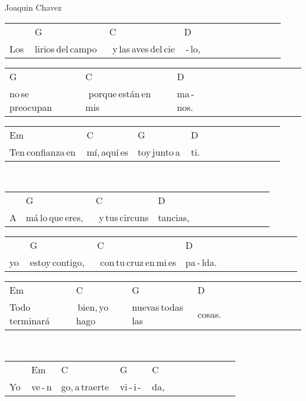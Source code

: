 Joaquin Chavez\hfill
\begin{multicols}{2}
\noindent
\begin{minipage}{\columnwidth}
\noindent
\noindent
\begin{tabular}{llllllllllll}
&G&C&D\\
Los\,&lirios\,del\,campo\,\,&\,\,y\,las\,aves\,del\,cie&\,-\,lo,
\end{tabular}

\noindent
\begin{tabular}{llllllllllll}
G&C&D\\
no\,se\,preocupan\,\,&\,\,porque\,están\,en\,mis\,&ma\,-\,nos.
\end{tabular}

\noindent
\begin{tabular}{llllllllllll}
Em&C&G&D\\
Ten\,confianza\,en\,&mí,\,aquí\,es&toy\,junto\,a\,&ti.
\end{tabular}
\end{minipage}\\

\noindent
\begin{minipage}{\columnwidth}
\noindent
\noindent
\begin{tabular}{llllllllllll}
&G&C&D\\
A&má\,lo\,que\,eres,\,\,&\,\,y\,tus\,circuns&tancias,
\end{tabular}

\noindent
\begin{tabular}{llllllllllll}
&G&C&D\\
yo\,&estoy\,contigo,\,\,&\,\,con\,tu\,cruz\,en\,mi\,es&pa\,-\,lda.
\end{tabular}

\noindent
\begin{tabular}{llllllllllll}
Em&C&G&D\\
Todo\,terminará&\,bien,\,yo\,hago\,&nuevas\,todas\,las\,&cosas.
\end{tabular}
\end{minipage}\\

\noindent
\begin{minipage}{\columnwidth}
\noindent
\noindent
\begin{tabular}{llllllllllll}
&Em&C&G&C\\
Yo\,&ve\,-\,n&go,\,a\,traerte\,&vi\,-\,i\,-\,&da,
\end{tabular}


\end{minipage}
\end{multicols}
